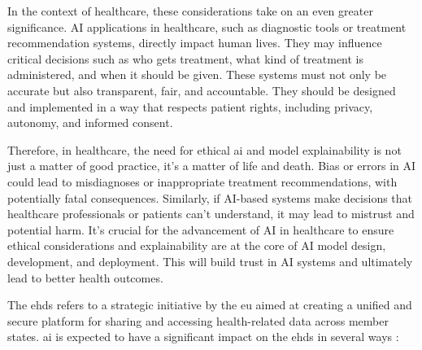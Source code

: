 In the context of healthcare, these considerations take on an even greater significance. AI applications in healthcare, such as diagnostic tools or treatment recommendation systems, directly impact human lives. They may influence critical decisions such as who gets treatment, what kind of treatment is administered, and when it should be given. These systems must not only be accurate but also transparent, fair, and accountable. They should be designed and implemented in a way that respects patient rights, including privacy, autonomy, and informed consent.

Therefore, in healthcare, the need for ethical \ac{ai} and model explainability is not just a matter of good practice, it's a matter of life and death. Bias or errors in AI could lead to misdiagnoses or inappropriate treatment recommendations, with potentially fatal consequences. Similarly, if AI-based systems make decisions that healthcare professionals or patients can't understand, it may lead to mistrust and potential harm. It's crucial for the advancement of AI in healthcare to ensure ethical considerations and explainability are at the core of AI model design, development, and deployment. This will build trust in AI systems and ultimately lead to better health outcomes.


The \ac{ehds} refers to a strategic initiative by the \ac{eu} aimed at creating a unified and secure platform for sharing and accessing health-related data across member states. \ac{ai} is expected to have a significant impact on the \ac{ehds} in several ways \cite{ehds}:

